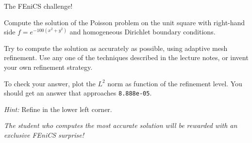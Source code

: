 \begin{frame}{The FEniCS challenge!}

  \small

  Compute the solution of the Poisson problem on the unit square with
  right-hand side $f = e^{-100(x^2 + y^2)}$ and homogeneous Dirichlet
  boundary conditions.

  Try to compute the solution as accurately as possible, using
  adaptive mesh refinement. Use any one of the techniques described
  in the lecture notes, or invent your own refinement strategy.

  To check your answer, plot the $L^2$ norm as function of the
  refinement level. You should get an answer that approaches
  \texttt{8.888e-05}.

  \emph{Hint:} Refine in the lower left corner.

  \emph{The student who computes the most accurate solution will be
    rewarded with an exclusive FEniCS surprise!}

\end{frame}
